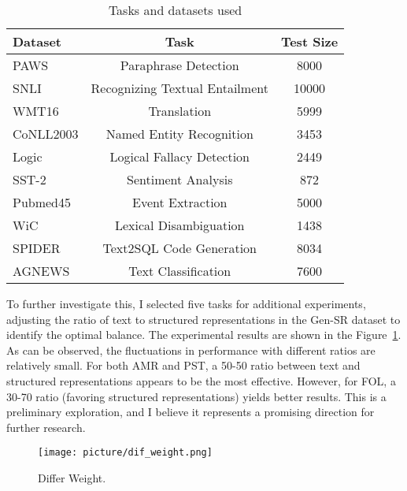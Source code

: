 \setlength{\tabcolsep}{4.5pt}
\renewcommand{\arraystretch}{1.2}
\begin{table}[h!]
\centering
\vspace{-0.1in}
\caption{Tasks and datasets used}
\label{tab:dataset_of_prompt}
\vspace{-0.1in}
\small
\resizebox{0.5\textwidth}{!}
{ 
\begin{tabular}{lcc}
\toprule
\textbf{Dataset} & \textbf{Task} & \textbf{Test Size} \\
\midrule
PAWS      & Paraphrase Detection          & 8000  \\
SNLI      & Recognizing Textual Entailment & 10000 \\
WMT16     & Translation                   & 5999  \\
CoNLL2003 & Named Entity Recognition       & 3453  \\
Logic     & Logical Fallacy Detection     & 2449  \\
SST-2     & Sentiment Analysis            & 872   \\
Pubmed45  & Event Extraction              & 5000  \\
WiC       & Lexical Disambiguation        & 1438  \\
SPIDER    & Text2SQL Code Generation      & 8034  \\
AGNEWS    & Text Classification           & 7600  \\
\bottomrule
\end{tabular}
} 
\vspace{-0.1in}
\end{table}



To further investigate this, I selected five tasks for additional experiments, adjusting the ratio of text to structured representations in the Gen-SR dataset to identify the optimal balance. The experimental results are shown in the Figure~\ref{fig:dif_weight}. As can be observed, the fluctuations in performance with different ratios are relatively small. For both AMR and PST, a 50-50 ratio between text and structured representations appears to be the most effective. However, for FOL, a 30-70 ratio (favoring structured representations) yields better results. This is a preliminary exploration, and I believe it represents a promising direction for further research.

\begin{figure}[h!]
\centering
\vspace{-0.1in}
\texttt{[image: picture/dif\_weight.png]}
\caption{Differ Weight.}
\label{fig:dif_weight}
\vspace{-0.1in}
\end{figure}